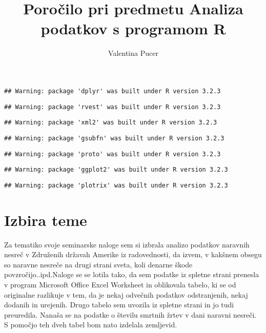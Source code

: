 \documentclass[]{article}
\title{Poročilo pri predmetu Analiza podatkov s programom R}
\author{Valentina Pucer}
\date{}
\begin{document}
\maketitle


\begin{verbatim}
## Warning: package 'dplyr' was built under R version 3.2.3
\end{verbatim}

\begin{verbatim}
## Warning: package 'rvest' was built under R version 3.2.3
\end{verbatim}

\begin{verbatim}
## Warning: package 'xml2' was built under R version 3.2.3
\end{verbatim}

\begin{verbatim}
## Warning: package 'gsubfn' was built under R version 3.2.3
\end{verbatim}

\begin{verbatim}
## Warning: package 'proto' was built under R version 3.2.3
\end{verbatim}

\begin{verbatim}
## Warning: package 'ggplot2' was built under R version 3.2.3
\end{verbatim}

\begin{verbatim}
## Warning: package 'plotrix' was built under R version 3.2.3
\end{verbatim}

\section{Izbira teme}\label{izbira-teme}

Za tematiko svoje seminarske naloge sem si izbrala analizo podatkov
naravnih nesreč v Združenih državah Amerike iz radovednosti, da izvem, v
kakšnem obsegu so naravne nesreče na drugi strani sveta, koli denarne
škode povzročijo..ipd.Naloge se se lotila tako, da sem podatke iz
spletne strani prenesla v program Microsoft Office Excel Worksheet in
oblikovala tabelo, ki se od originalne razlikuje v tem, da je nekaj
odvečnih podatkov odstranjenih, nekaj dodanih in urejenih. Drugo tabelo
sem uvozila iz spletne strani in jo tudi preuredila. Nanaša se na
podatke o številu smrtnih žrtev v dani naravni nesreči. S pomočjo teh
dveh tabel bom nato izdelala zemljevid.
\end{document}
